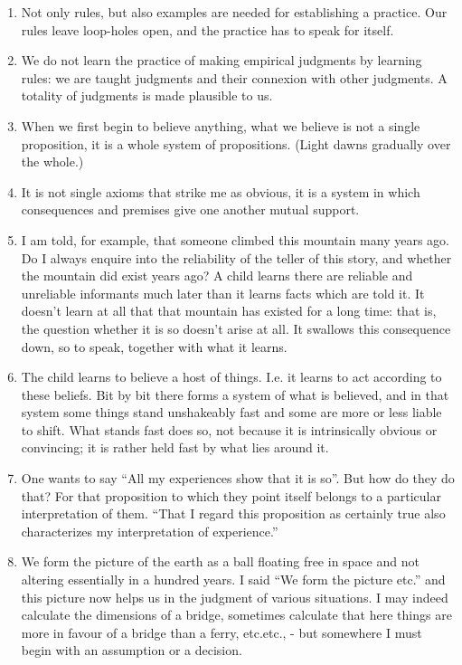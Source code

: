 \documentclass{book}
\begin{document}
\begin{enumerate}
\item
Not only rules, but also examples are needed for establishing a practice. Our
rules leave loop-holes open, and the practice has to speak for itself.

\item
We do not learn the practice of making empirical judgments by learning rules:
we are taught judgments and their connexion with other judgments. A totality of
judgments is made plausible to us.

\item
When we first begin to believe anything, what we believe is not a single
proposition, it is a whole system of propositions. (Light dawns gradually over
the whole.)

\item
It is not single axioms that strike me as obvious, it is a system in which
consequences and premises give one another mutual support.

\item
I am told, for example, that someone climbed this mountain many years ago. Do I
always enquire into the reliability of the teller of this story, and whether
the mountain did exist years ago? A child learns there are reliable and
unreliable informants much later than it learns facts which are told it. It
doesn't learn at all that that mountain has existed for a long time: that is,
the question whether it is so doesn't arise at all. It swallows this
consequence down, so to speak, together with what it learns.

\item
The child learns to believe a host of things. I.e. it learns to act according
to these beliefs. Bit by bit there forms a system of what is believed, and in
that system some things stand unshakeably fast and some are more or less liable
to shift. What stands fast does so, not because it is intrinsically obvious or
convincing; it is rather held fast by what lies around it.

\item
One wants to say ``All my experiences show that it is so''. But how do they do
that? For that proposition to which they point itself belongs to a particular
interpretation of them.  ``That I regard this proposition as certainly true
also characterizes my interpretation of experience.''

\item
We form the picture of the earth as a ball floating free in space and not
altering essentially in a hundred years. I said ``We form the picture etc.''
and this picture now helps us in the judgment of various situations.  I may
indeed calculate the dimensions of a bridge, sometimes calculate that here
things are more in favour of a bridge than a ferry, etc.etc., - but somewhere I
must begin with an assumption or a decision.


\end{enumerate}
\end{document}
